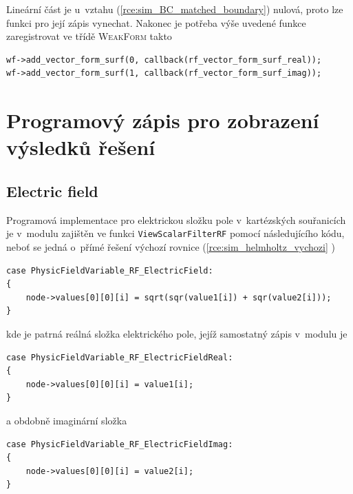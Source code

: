 Lineární část je u~vztahu (\ref{rce:sim_BC_matched_boundary}) nulová, proto lze funkci pro její zápis vynechat.
Nakonec je potřeba výše uvedené funkce zaregistrovat ve třídě \textsc{WeakForm} takto
\begin{verbatim}
wf->add_vector_form_surf(0, callback(rf_vector_form_surf_real));
wf->add_vector_form_surf(1, callback(rf_vector_form_surf_imag));           
\end{verbatim}


\section{Programový zápis pro zobrazení výsledků řešení}
\subsection*{Electric field}
Programová implementace pro elektrickou složku pole v~kartézských souřanicích je v~modulu zajištěn ve funkci \texttt{ViewScalarFilterRF} pomocí následujícího kódu, neboť se jedná o~přímé řešení výchozí rovnice (\ref{rce:sim_helmholtz_vychozi} )
\begin{verbatim}
case PhysicFieldVariable_RF_ElectricField:
{
    node->values[0][0][i] = sqrt(sqr(value1[i]) + sqr(value2[i]));
}    
\end{verbatim}
kde je patrná reálná složka elektrického pole, jejíž samostatný zápis v~modulu je
\begin{verbatim}
case PhysicFieldVariable_RF_ElectricFieldReal:
{
    node->values[0][0][i] = value1[i];
}    
\end{verbatim}
a obdobně imaginární složka 
\begin{verbatim}
case PhysicFieldVariable_RF_ElectricFieldImag:
{    
    node->values[0][0][i] = value2[i];
}
\end{verbatim}

